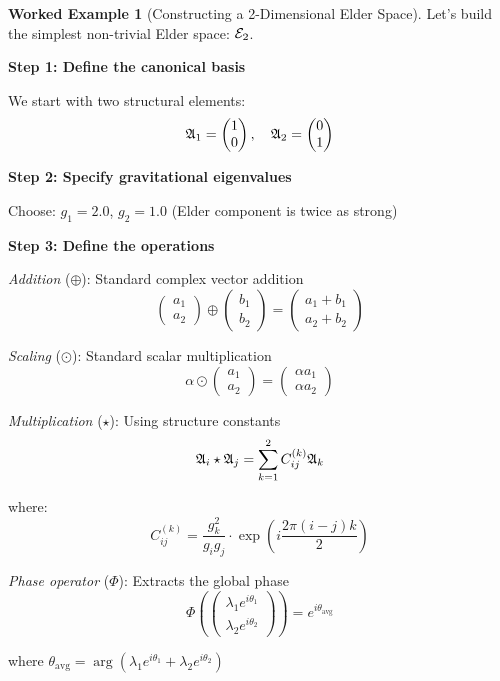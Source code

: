 \documentclass[12pt,a4paper]{article}
\theoremstyle{definition}
\newtheorem{example}{Worked Example}[section]
\theoremstyle{remark}
\begin{document}
\begin{example}[Constructing a 2-Dimensional Elder Space]
Let's build the simplest non-trivial Elder space: $\mathcal{E}_{2}$.

\textbf{Step 1: Define the canonical basis}

We start with two structural elements:
$$\mathfrak{A}_{1} = \begin{pmatrix} 1 \\ 0 \end{pmatrix}, \quad \mathfrak{A}_{2} = \begin{pmatrix} 0 \\ 1 \end{pmatrix}$$

\textbf{Step 2: Specify gravitational eigenvalues}

Choose: $g_1 = 2.0$, $g_2 = 1.0$ (Elder component is twice as strong)

\textbf{Step 3: Define the operations}

\textit{Addition} ($\oplus$): Standard complex vector addition
$$\begin{pmatrix} a_1 \\ a_2 \end{pmatrix} \oplus \begin{pmatrix} b_1 \\ b_2 \end{pmatrix} = \begin{pmatrix} a_1 + b_1 \\ a_2 + b_2 \end{pmatrix}$$

\textit{Scaling} ($\odot$): Standard scalar multiplication
$$\alpha \odot \begin{pmatrix} a_1 \\ a_2 \end{pmatrix} = \begin{pmatrix} \alpha a_1 \\ \alpha a_2 \end{pmatrix}$$

\textit{Multiplication} ($\star$): Using structure constants
$$\mathfrak{A}_{i} \star \mathfrak{A}_{j} = \sum_{k=1}^{2} C_{ij}^{(k)} \mathfrak{A}_{k}$$

where:
$$C_{ij}^{(k)} = \frac{g_k^2}{g_i g_j} \cdot \exp\left(i\frac{2\pi(i-j)k}{2}\right)$$

\textit{Phase operator} ($\Phi$): Extracts the global phase
$$\Phi\left(\begin{pmatrix} \lambda_1 e^{i\theta_1} \\ \lambda_2 e^{i\theta_2} \end{pmatrix}\right) = e^{i\theta_{\text{avg}}}$$

where $\theta_{\text{avg}} = \arg(\lambda_1 e^{i\theta_1} + \lambda_2 e^{i\theta_2})$
\end{example}
\end{document}
